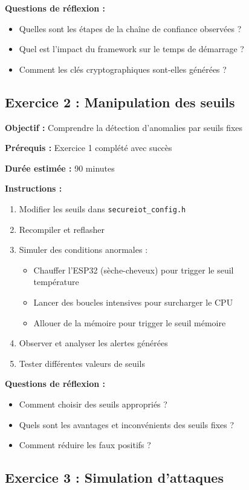 \begin{figure}[h]
\begin{table}[h]
\textbf{Questions de réflexion :}
\begin{itemize}
    \item Quelles sont les étapes de la chaîne de confiance observées ?
    \item Quel est l'impact du framework sur le temps de démarrage ?
    \item Comment les clés cryptographiques sont-elles générées ?
\end{itemize}

\subsection{Exercice 2 : Manipulation des seuils}

\textbf{Objectif :} Comprendre la détection d'anomalies par seuils fixes

\textbf{Prérequis :} Exercice 1 complété avec succès

\textbf{Durée estimée :} 90 minutes

\textbf{Instructions :}
\begin{enumerate}
    \item Modifier les seuils dans \texttt{secureiot\_config.h}
    \item Recompiler et reflasher
    \item Simuler des conditions anormales :
    \begin{itemize}
        \item Chauffer l'ESP32 (sèche-cheveux) pour trigger le seuil température
        \item Lancer des boucles intensives pour surcharger le CPU
        \item Allouer de la mémoire pour trigger le seuil mémoire
    \end{itemize}
    \item Observer et analyser les alertes générées
    \item Tester différentes valeurs de seuils
\end{enumerate}

\textbf{Questions de réflexion :}
\begin{itemize}
    \item Comment choisir des seuils appropriés ?
    \item Quels sont les avantages et inconvénients des seuils fixes ?
    \item Comment réduire les faux positifs ?
\end{itemize}

\subsection{Exercice 3 : Simulation d'attaques}


\end{table}
\end{figure}
